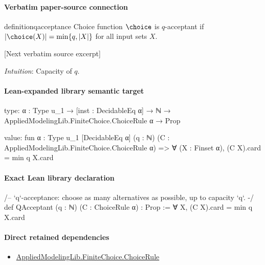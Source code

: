 \documentclass[10pt]{article}
\begin{document}
\paragraph{Verbatim paper-source connection}
\begin{ReviewVerbatim}
\begin{restatable}[$q$-Acceptance]{definition}{qacceptance}
\label{def:q-acceptance}
Choice function $\choice$ is $q$-acceptant if $|\choice(X)| = \min\{q, |X|\}$ for all input sets $X$.
\end{restatable}

[Next verbatim source excerpt]

\qacceptance*
\textit{Intuition}: Capacity of $q$.

\substitutability*
\end{ReviewVerbatim}



\paragraph{Lean-expanded library semantic target}
\begin{ReviewVerbatim}
type:
{α : Type u_1} → [inst : DecidableEq α] → ℕ → AppliedModelingLib.FiniteChoice.ChoiceRule α → Prop

value:
fun {α : Type u_1} [DecidableEq α] (q : ℕ) (C : AppliedModelingLib.FiniteChoice.ChoiceRule α) =>
  ∀ (X : Finset α), (C X).card = min q X.card
\end{ReviewVerbatim}

\paragraph{Exact Lean library declaration}
\begin{ReviewVerbatim}
/-- `q`-acceptance: choose as many alternatives as possible, up to capacity `q`. -/
def QAcceptant (q : ℕ) (C : ChoiceRule α) : Prop :=
  ∀ X, (C X).card = min q X.card
\end{ReviewVerbatim}

\paragraph{Direct retained dependencies}
\begin{itemize}\raggedright
\item \hyperlink{library-prerequisite-5dea5c3766008208}{Applied\allowbreak{}Modeling\allowbreak{}Lib.\allowbreak{}Finite\allowbreak{}Choice.\allowbreak{}Choice\allowbreak{}Rule}
\end{itemize}
\end{document}
